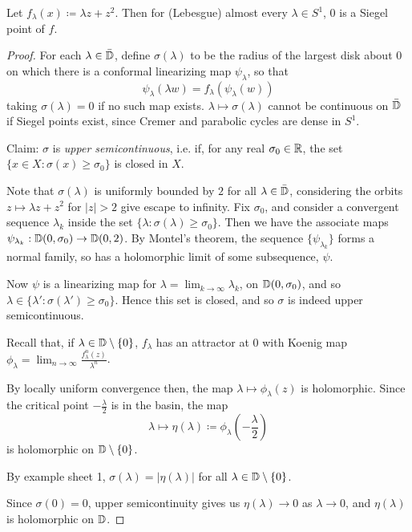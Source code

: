 \documentclass[10pt,a4paper]{article}
\begin{document}
\begin{proposition}
  Let $f_\lambda(x) \coloneqq \lambda z + z^2$. Then for (Lebesgue) almost every $\lambda \in S^1$, 0 is a Siegel point of $f$.
\end{proposition}
\begin{proof}
  For each $\lambda \in \bar{\mathbb{D}}$, define $\sigma(\lambda)$ to be the radius of the largest disk about 0 on which there is a conformal linearizing map $\psi_\lambda$, so that
  \[\psi_\lambda(\lambda w) = f_\lambda(\psi_\lambda(w))\]
  taking $\sigma(\lambda) = 0$ if no such map exists. $\lambda \mapsto \sigma(\lambda)$ cannot be continuous on $\bar{\mathbb{D}}$ if Siegel points exist, since Cremer and parabolic cycles are dense in $S^1$.

  Claim: $\sigma$ is \emph{upper semicontinuous}, i.e. if, for any real $\sigma_0 \in \mathbb{R}$, the set $\{x \in X: \sigma(x) \geq \sigma_0\}$ is closed in $X$.

  Note that $\sigma(\lambda)$ is uniformly bounded by $2$ for all $\lambda \in \bar{\mathbb{D}}$, considering the orbits $z \mapsto \lambda z + z^2$ for $|z|>2$ give escape to infinity. Fix $\sigma_0$, and consider a convergent sequence $\lambda_k$ inside the set $\{\lambda: \sigma(\lambda) \geq \sigma_0\}$. Then we have the associate maps $\psi_{\lambda_k}:\mathbb{D}(0, \sigma_0) \to \mathbb{D}(0, 2)$. By Montel's theorem, the sequence $\{\psi_{\lambda_k}\}$ forms a normal family, so has a holomorphic limit of some subsequence, $\psi$.

  Now $\psi$ is a linearizing map for $\lambda = \lim_{k \to \infty} \lambda_k$, on $\mathbb{D}(0, \sigma_0)$, and so $\lambda \in \{\lambda' : \sigma(\lambda') \geq \sigma_0\}$. Hence this set is closed, and so $\sigma$ is indeed upper semicontinuous.

  Recall that, if $\lambda \in \mathbb{D}\setminus\{0\}$, $f_\lambda$ has an attractor at $0$ with Koenig map $\phi_\lambda = \lim_{n\to\infty}\frac{f_\lambda^n(z)}{\lambda^n}$.

  By locally uniform convergence then, the map $\lambda \mapsto \phi_\lambda(z)$ is holomorphic. Since the critical point $-\frac{\lambda}{2}$ is in the basin, the map
  \[\lambda\mapsto \eta(\lambda) \coloneqq \phi_\lambda\left(-\frac{\lambda}{2}\right)\]
  is holomorphic on $\mathbb{D}\setminus\{0\}$.

  By example sheet 1, $\sigma(\lambda) = |\eta(\lambda)|$ for all $\lambda \in \mathbb{D}\setminus\{0\}$.

  Since $\sigma(0) = 0$, upper semicontinuity gives us $\eta(\lambda) \to 0$ as $\lambda \to 0$, and $\eta(\lambda)$ is holomorphic on $\mathbb{D}$.


\end{proof}
\end{document}
